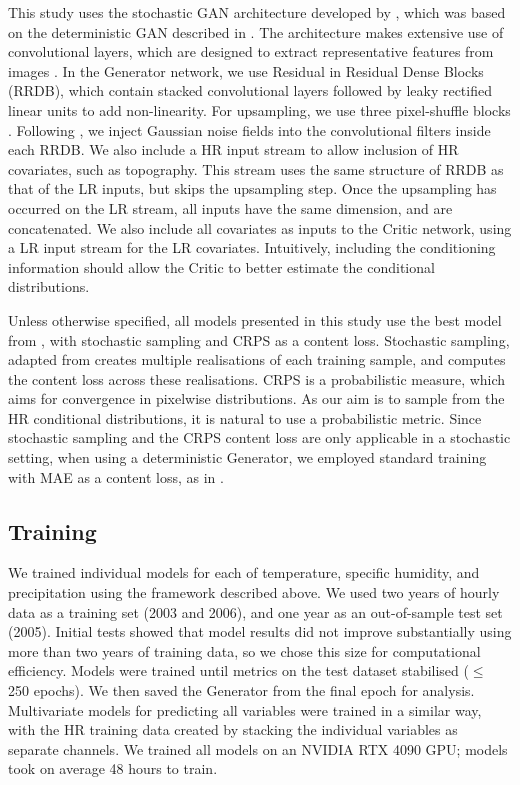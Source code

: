 \documentclass{ametsocV6.1}
\begin{document}
This study uses the stochastic GAN architecture developed by \citet{daust2024capturing}, which was based on the deterministic GAN described in \citet{annau2023algorithmic}. The architecture makes extensive use of convolutional layers, which are designed to extract representative features from images \citep{li2021survey}. In the Generator network, we use Residual in Residual Dense Blocks (RRDB), which contain stacked convolutional layers followed by leaky rectified linear units to add non-linearity. For upsampling, we use three pixel-shuffle blocks \citep{shi2016real}. Following \citet{daust2024capturing}, we inject Gaussian noise fields into the convolutional filters inside each RRDB. We also include a HR input stream to allow inclusion of HR covariates, such as topography. This stream uses the same structure of RRDB as that of the LR inputs, but skips the upsampling step. Once the upsampling has occurred on the LR stream, all inputs have the same dimension, and are concatenated. We also include all covariates as inputs to the Critic network, using a LR input stream for the LR covariates. Intuitively, including the conditioning information should allow the Critic to better estimate the conditional distributions. 

Unless otherwise specified, all models presented in this study use the best model from \citet{daust2024capturing}, with stochastic sampling and CRPS as a content loss. Stochastic sampling, adapted from \citet{harris2022generative} creates multiple realisations of each training sample, and computes the content loss across these realisations. CRPS is a probabilistic measure, which aims for convergence in pixelwise distributions. As our aim is to sample from the HR conditional distributions, it is natural to use a probabilistic metric. Since stochastic sampling and the CRPS content loss are only applicable in a stochastic setting, when using a deterministic Generator, we employed standard training with MAE as a content loss, as in \citet{annau2023algorithmic}. 

\subsection{Training}
We trained individual models for each of temperature, specific humidity, and precipitation using the framework described above. We used two years of hourly data as a training set (2003 and 2006), and one year as an out-of-sample test set (2005). Initial tests showed that model results did not improve substantially using more than two years of training data, so we chose this size for computational efficiency. Models were trained until metrics on the test dataset stabilised ($\leq$ 250 epochs). We then saved the Generator from the final epoch for analysis. Multivariate models for predicting all variables were trained in a similar way, with the HR training data created by stacking the individual variables as separate channels. We trained all models on an NVIDIA RTX 4090 GPU; models took on average 48 hours to train.
\end{document}
